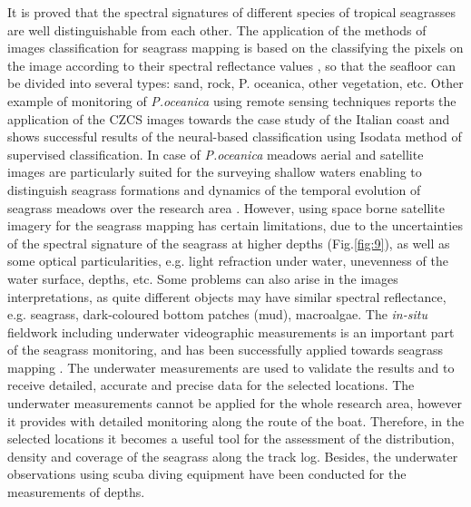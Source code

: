 \documentclass[11pt]{article}
\begin{document}
It is proved \cite{Thorhaug07} \label{Thorhaug07} that the spectral signatures of different species of tropical seagrasses are well
distinguishable from each other. The application of the methods of images classification for seagrass
mapping is based on the classifying the pixels on the image according to their spectral reflectance
values \cite{Fornes06} \label{Fornes06}, so that the seafloor can be divided into several types: sand, rock, P.
oceanica, other vegetation, etc.
Other example of monitoring of \textit{P.oceanica} using remote sensing techniques \cite{Calvo03}\label{Calvo03}
reports the application of the \ac{CZCS} images towards the case study of the Italian coast and shows
successful results of the neural-based classification using Isodata method of supervised classification.
In case of \textit{P.oceanica} meadows aerial and satellite images are particularly suited for the surveying
shallow waters \cite{Pasqualini98b}\label{Pasqualini98b} enabling to distinguish seagrass formations and dynamics of
the temporal evolution of seagrass meadows over the research area \cite{Pasqualini01}\label{Pasqualini01}.
However, using space borne satellite imagery for the seagrass mapping has certain limitations, due to
the uncertainties of the spectral signature of the seagrass at higher depths  (Fig.\ref{fig:9}), as well as some
optical particularities, e.g. light refraction under water, unevenness of the water surface, depths, etc.
Some problems can also arise in the images interpretations, as quite different objects may have
similar spectral reflectance, e.g. seagrass, dark-coloured bottom patches (mud), macroalgae.
The \textit{in-situ} fieldwork including underwater videographic measurements is an important part of the
seagrass monitoring, and has been successfully applied towards seagrass mapping \cite{Haag08}\label{Haag08}.
The underwater measurements are used to validate the results and to receive detailed, accurate and
precise data for the selected locations. The underwater measurements cannot be applied for the whole
research area, however it provides with detailed monitoring along the route of the boat. Therefore, in
the selected locations it becomes a useful tool for the assessment of the distribution, density and
coverage of the seagrass along the track log. Besides, the underwater observations using scuba diving
equipment have been conducted for the measurements of depths.
\end{document}
